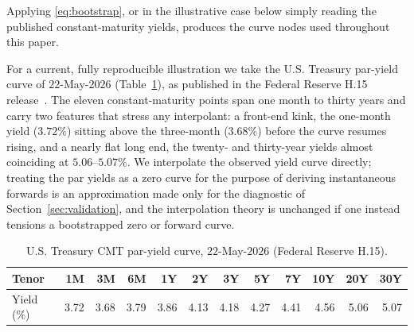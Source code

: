 \documentclass[]{interact}
\theoremstyle{plain}
\begin{document}
Applying \eqref{eq:bootstrap}, or in the illustrative case below simply reading the published
constant-maturity yields, produces the curve nodes used throughout this paper.

For a current, fully reproducible illustration we take the U.S. Treasury par-yield curve of
$22$-May-$2026$ (Table~\ref{tab:data}), as published in the Federal Reserve H.15
release~\cite{H15}. The eleven constant-maturity points span one month to thirty years and
carry two features that stress any interpolant: a front-end kink, the one-month yield
($3.72\%$) sitting above the three-month ($3.68\%$) before the curve resumes rising, and a
nearly flat long end, the twenty- and thirty-year yields almost coinciding at $5.06$--$5.07\%$.
We interpolate the observed yield curve directly; treating the par yields as a zero curve for
the purpose of deriving instantaneous forwards is an approximation made only for the diagnostic
of Section~\ref{sec:validation}, and the interpolation theory is unchanged if one instead
tensions a bootstrapped zero or forward curve.

\begin{table}[t]\small\centering
\caption{U.S. Treasury CMT par-yield curve, $22$-May-$2026$ (Federal Reserve H.15).}\label{tab:data}
\begin{tabular}{lrrrrrrrrrrr}
\toprule
Tenor & 1M & 3M & 6M & 1Y & 2Y & 3Y & 5Y & 7Y & 10Y & 20Y & 30Y\\
\midrule
Yield (\%) & 3.72 & 3.68 & 3.79 & 3.86 & 4.13 & 4.18 & 4.27 & 4.41 & 4.56 & 5.06 & 5.07\\
\bottomrule
\end{tabular}
\end{table}
\end{document}
